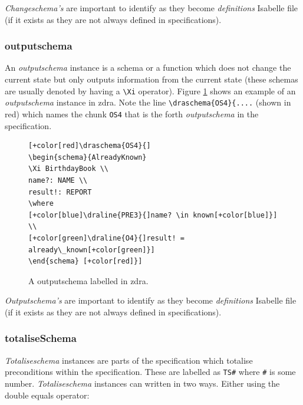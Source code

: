 \emph{Changeschema's} are important to identify as they become \emph{definitions}
Isabelle file (if it exists as they are not always defined in specifications).

\subsubsection{outputschema}

An \emph{outputschema} instance is a schema or a function which does not change
the current state but only outputs information from the current state (these
schemas are usually denoted by having a \verb|\Xi| operator). Figure
\ref{fig:exampleofos} shows an example of an \emph{outputschema} instance in
\gls{zdra}. Note the line \verb|\draschema{OS4}{....| (shown in red) which names
the chunk \verb|OS4| that is the forth \emph{outputschema} in the specification.

\begin{figure}[H]
\centering
\begin{footnotesize}
\begin{BVerbatim}[commandchars=+\[\]]
[+color[red]\draschema{OS4}{]
\begin{schema}{AlreadyKnown}
\Xi BirthdayBook \\
name?: NAME \\
result!: REPORT
\where
[+color[blue]\draline{PRE3}{]name? \in known[+color[blue]}] \\
[+color[green]\draline{O4}{]result! = already\_known[+color[green]}]
\end{schema} [+color[red]}]
\end{BVerbatim}
\end{footnotesize}
\caption{\label{fig:exampleofos} A outputschema labelled in \gls{zdra}.}
\end{figure}

\emph{Outputschema's} are important to identify as they become \emph{definitions}
Isabelle file (if it exists as they are not always defined in specifications).

\subsubsection{totaliseSchema}

\emph{Totaliseschema} instances are parts of the specification which totalise
preconditions within the specification. These are labelled as
\verb|TS#| where \verb|#| is some number. \emph{Totaliseschema} instances can written
in two ways. Either using the double equals operator:

